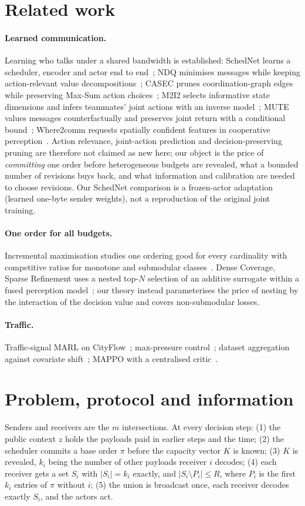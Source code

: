 \documentclass[11pt]{article}
\theoremstyle{definition}
\begin{document}
\section{Related work}
\paragraph{Learned communication.} Learning who talks under a shared bandwidth is established:
SchedNet learns a scheduler, encoder and actor end to end~\cite{schednet}; NDQ minimises messages
while keeping action-relevant value decompositions~\cite{ndq}; CASEC prunes coordination-graph edges
while preserving Max-Sum action choices~\cite{casec}; M2I2 selects informative state dimensions and
infers teammates' joint actions with an inverse model~\cite{m2i2}; MUTE values messages
counterfactually and preserves joint return with a conditional bound~\cite{mute}; Where2comm
requests spatially confident features in cooperative perception~\cite{where2comm}. Action relevance,
joint-action prediction and decision-preserving pruning are therefore not claimed as new here; our
object is the price of \emph{committing} one order before heterogeneous budgets are revealed, what
a bounded number of revisions buys back, and what information and calibration are needed to choose
revisions. Our SchedNet comparison is a frozen-actor adaptation (learned one-byte sender weights),
not a reproduction of the original joint training.
\paragraph{One order for all budgets.} Incremental maximisation studies one ordering good for every
cardinality with competitive ratios for monotone and submodular classes~\cite{bernstein2022,bienkowski2026}.
Dense Coverage, Sparse Refinement uses a nested top-$N$ selection of an additive surrogate within a
fused perception model~\cite{densecoverage}; our theory instead parameterises the price of nesting by
the interaction of the decision value and covers non-submodular losses.
\paragraph{Traffic.} Traffic-signal MARL on CityFlow~\cite{cityflow,colight}; max-pressure
control~\cite{varaiya2013}; dataset aggregation against covariate shift~\cite{dagger}; MAPPO with a
centralised critic~\cite{mappo}.

\section{Problem, protocol and information}\label{sec:protocol}
Senders and receivers are the $m$ intersections. At every decision step:
(1) the public context $z$ holds the payloads paid in earlier steps and the time;
(2) the scheduler commits a base order $\pi$ before the capacity vector $K$ is known;
(3) $K$ is revealed, $k_i$ being the number of other payloads receiver $i$ decodes;
(4) each receiver gets a set $S_i$ with $|S_i|=k_i$ exactly, and $|S_i\setminus P_i|\le R$, where $P_i$ is
the first $k_i$ entries of $\pi$ without $i$;
(5) the union is broadcast once, each receiver decodes exactly $S_i$, and the actors act.
\end{document}
